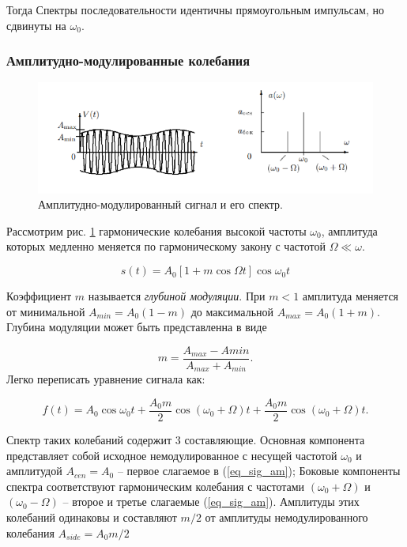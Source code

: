 \documentclass{article}
\begin{document}
Тогда Спектры последовательности идентичны прямоугольным импульсам, но
сдвинуты на $\omega_0$.

\subsubsection{Амплитудно-модулированные колебания}
\begin{figure}[H]
    \centering
    \includegraphics[width=\textwidth]{AM_signal_example.png}
    \caption{Амплитудно-модулированный сигнал и его спектр.} 
    \label{pic_am_sig_example}
\end{figure}

Рассмотрим рис. \ref{pic_am_sig_example} гармонические колебания высокой частоты $\omega_0$, амплитуда которых
медленно меняется по гармоническому закону с частотой $\Omega \ll \omega$.

\[ s(t) = A_0\left[1 + m \cos \Omega t\right] \cos \omega_0 t \]

Коэффициент $m$ называется \emph{глубиной модуляции}. При \( m < 1 \) амплитуда меняется от минимальной 
\( A_{min} = A_0(1 - m) \) до максимальной \( A_{max} = A_0(1 + m) \). Глубина модуляции может быть представленна
в виде

\[ m = \frac{A_{max} - A{min}}{A_{max} + A_{min}}. \]
Легко переписать уравнение сигнала как:

\begin{equation}
    f(t) = A_0 \cos \omega_0t + \frac{A_0m}{2} \cos \left(\omega_0 + \Omega\right)t  + \frac{A_0m}{2} 
    \cos \left(\omega_0 + \Omega\right)t.
    \label{eq_sig_am}
\end{equation}

Спектр таких колебаний содержит 3 составляющие. Основная компонента представляет собой исходное немодулированное
с несущей частотой \(\omega_0\) и амплитудой \(A_{cen} = A_0\) -- первое слагаемое в (\ref{eq_sig_am}); Боковые компоненты
спектра  соответствуют гармоническим колебания с частотами \((\omega_0 + \Omega)\) и \((\omega_0 - \Omega)\) -- второе
и третье слагаемые (\ref{eq_sig_am}). Амплитуды этих колебаний одинаковы и составляют \(m/2\) от амплитуды
немодулированного колебания \( A_{side} = A_0m/2\)
\end{document}
